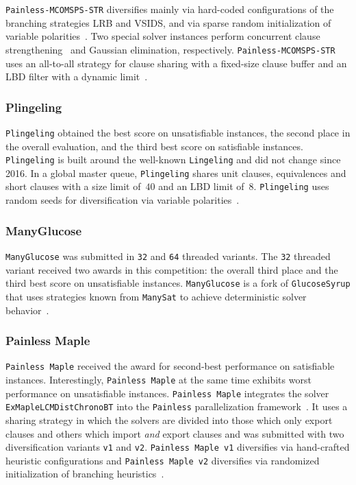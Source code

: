 \documentclass{elsarticle}
\newcommand{\solver}[1]{\texttt{#1}}
\begin{document}
\solver{Painless-MCOMSPS-STR} diversifies mainly via hard-coded configurations of the branching strategies LRB and VSIDS, and via sparse random initialization of variable polarities~\cite{Balyo:2015:HordeSATs}. 
Two special solver instances perform concurrent clause strengthening~\cite{Wieringa:2013:CCS} and Gaussian elimination, respectively. 
\solver{Painless-MCOMSPS-STR} uses an all-to-all strategy for clause sharing with a fixed-size clause buffer and an LBD filter with a dynamic limit~\cite{SC2020}. 


\subsubsection{Plingeling} 

\solver{Plingeling} obtained the best score on unsatisfiable instances, the second place in the overall evaluation, and the third best score on satisfiable instances. 
\solver{Plingeling} is built around the well-known \solver{Lingeling} and did not change since 2016. 
In a global master queue, \solver{Plingeling} shares unit clauses, equivalences and short clauses with a size limit of~$40$ and an LBD limit of~$8$. 
\solver{Plingeling} uses random seeds for diversification via variable polarities~\cite{Biere:SC2020,Biere:2012:Lingeling}. 


\subsubsection{ManyGlucose}

\solver{ManyGlucose} was submitted in \solver{32} and \solver{64} threaded variants. 
The \solver{32} threaded variant received two awards in this competition: the overall third place and the third best score on unsatisfiable instances. 
\solver{ManyGlucose} is a fork of \solver{GlucoseSyrup} that uses strategies known from \solver{ManySat} to achieve deterministic solver behavior~\cite{Audemard:2018:GlucoseSyrup,Audemard:2014:LazyClauseExchange,Hamadi:2009:ManySat}. 


\subsubsection{Painless Maple} 

\solver{Painless Maple} received the award for second-best performance on satisfiable instances. 
Interestingly, \solver{Painless Maple}  
at the same time exhibits worst performance on unsatisfiable instances. 
\solver{Painless Maple} integrates the solver \solver{ExMapleLCMDistChronoBT} into the \solver{Painless} parallelization framework~\cite{Frioux:2017:Painless}. 
It uses a sharing strategy in which the solvers are divided into those which only export clauses and others which import \emph{and} export clauses and was submitted with two diversification variants \solver{v1} and \solver{v2}. 
\solver{Painless Maple v1} diversifies via hand-crafted heuristic configurations and \solver{Painless Maple v2} diversifies via randomized initialization of branching heuristics~\cite{SC2020}. 
\end{document}
